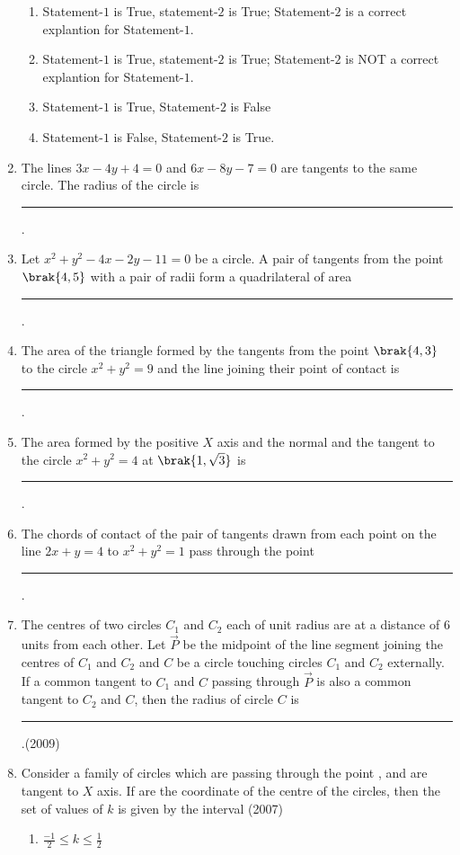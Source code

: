 \begin{enumerate}
\begin{enumerate}
\item Statement-$1$ is True, statement-$2$ is True; Statement-$2$ is a correct explantion for Statement-$1$.
\item Statement-$1$ is True, statement-$2$ is True; Statement-$2$ is NOT a correct explantion for Statement-$1$.
\item Statement-$1$ is True,  Statement-$2$ is False
\item Statement-$1$ is False,  Statement-$2$ is True.
\end{enumerate}
%
\item The lines $3x-4y+4=0$ and $6x-8y-7=0$ are tangents to the same circle. The radius of the circle is \rule{1cm}{0.01pt}.
	\hfill{}
\item Let $x^{2}+y^{2}-4x-2y-11=0$ be a circle. A pair of tangents from the point $\brak{4, 5}$ with a pair of radii form a quadrilateral of area
\rule{1cm}{0.01pt}.
%
	\hfill{}
\item The area of the triangle formed by the tangents from the point $\brak{4, 3}$ to the circle $x^{2}+y^{2}=9$ and the line joining their point of contact is
\rule{1cm}{0.01pt}.
%
	\hfill{}
\item The area formed by the positive $X$ axis and the normal and the tangent to the circle $x^{2}+y^{2}=4$ at $\brak{1, \sqrt{3}}$ is
\rule{1cm}{0.01pt}.
%
	\hfill{}
\item The chords of contact of the pair of tangents drawn from each point on the line $2x+y=4$ to $x^{2}+y^{2}=1$ pass through the point \rule{1cm}{0.01pt}.
%
	\hfill{}
\item The centres of two circles $C_1$ and $C_2$ each of unit radius are at a distance of $6$ units from each other. Let $\vec{P}$ be the midpoint of the line segment joining the centres of $C_1$ and $C_2$ and $C$ be a circle touching circles $C_1$ and $C_2$ externally. If a common tangent to $C_1$ and $C$ passing through $\vec{P}$ is also a common tangent to $C_2$ and $C$,  then the radius of circle $C$ is  \rule{1cm}{0.01pt}.\hfill(2009)
\item Consider a family of circles which are passing through the point ,  and are tangent to $X$ axis. If  are the coordinate of the centre of the circles,  then the set of values of $k$ is given by the interval
\hfill{(2007)}
\begin{multicols}{4}
\begin{enumerate}
\item $\frac{-1}{2} \le k \le \frac{1}{2}$

\end{enumerate}
\end{multicols}
\end{enumerate}
